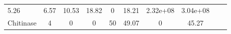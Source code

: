 \documentclass[]{article}
\begin{document}
\begin{longtable}[]{@{}lccccccccc@{}}
\begin{minipage}[t]{0.08\columnwidth}
5.26\strut
\end{minipage} & \begin{minipage}[t]{0.08\columnwidth}\centering\strut
6.57\strut
\end{minipage} & \begin{minipage}[t]{0.08\columnwidth}\centering\strut
10.53\strut
\end{minipage} & \begin{minipage}[t]{0.08\columnwidth}\centering\strut
18.82\strut
\end{minipage} & \begin{minipage}[t]{0.08\columnwidth}\centering\strut
0\strut
\end{minipage} & \begin{minipage}[t]{0.08\columnwidth}\centering\strut
18.21\strut
\end{minipage} & \begin{minipage}[t]{0.08\columnwidth}\centering\strut
2.32e+08\strut
\end{minipage} & \begin{minipage}[t]{0.08\columnwidth}\centering\strut
3.04e+08\strut
\end{minipage}\tabularnewline
\begin{minipage}[t]{0.07\columnwidth}\raggedright\strut
Chitinase\strut
\end{minipage} & \begin{minipage}[t]{0.06\columnwidth}\centering\strut
4\strut
\end{minipage} & \begin{minipage}[t]{0.08\columnwidth}\centering\strut
0\strut
\end{minipage} & \begin{minipage}[t]{0.08\columnwidth}\centering\strut
0\strut
\end{minipage} & \begin{minipage}[t]{0.08\columnwidth}\centering\strut
50\strut
\end{minipage} & \begin{minipage}[t]{0.08\columnwidth}\centering\strut
49.07\strut
\end{minipage} & \begin{minipage}[t]{0.08\columnwidth}\centering\strut
0\strut
\end{minipage} & \begin{minipage}[t]{0.08\columnwidth}\centering\strut
45.27\strut
\end{minipage} & \begin{minipage}[t]{0.08\columnwidth}\centering\strut

\end{minipage}
\end{longtable}
\end{document}
